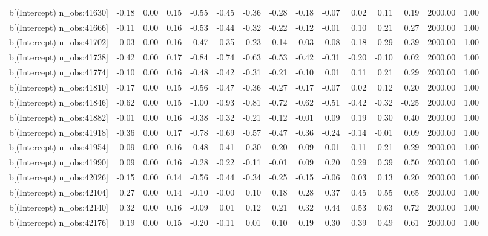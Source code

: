 \begin{table}[ht]
\begin{tabular}{rrrrrrrrrrrrrrr}
  b[(Intercept) n\_obs:41630] & -0.18 & 0.00 & 0.15 & -0.55 & -0.45 & -0.36 & -0.28 & -0.18 & -0.07 & 0.02 & 0.11 & 0.19 & 2000.00 & 1.00 \\ 
  b[(Intercept) n\_obs:41666] & -0.11 & 0.00 & 0.16 & -0.53 & -0.44 & -0.32 & -0.22 & -0.12 & -0.01 & 0.10 & 0.21 & 0.27 & 2000.00 & 1.00 \\ 
  b[(Intercept) n\_obs:41702] & -0.03 & 0.00 & 0.16 & -0.47 & -0.35 & -0.23 & -0.14 & -0.03 & 0.08 & 0.18 & 0.29 & 0.39 & 2000.00 & 1.00 \\ 
  b[(Intercept) n\_obs:41738] & -0.42 & 0.00 & 0.17 & -0.84 & -0.74 & -0.63 & -0.53 & -0.42 & -0.31 & -0.20 & -0.10 & 0.02 & 2000.00 & 1.00 \\ 
  b[(Intercept) n\_obs:41774] & -0.10 & 0.00 & 0.16 & -0.48 & -0.42 & -0.31 & -0.21 & -0.10 & 0.01 & 0.11 & 0.21 & 0.29 & 2000.00 & 1.00 \\ 
  b[(Intercept) n\_obs:41810] & -0.17 & 0.00 & 0.15 & -0.56 & -0.47 & -0.36 & -0.27 & -0.17 & -0.07 & 0.02 & 0.12 & 0.20 & 2000.00 & 1.00 \\ 
  b[(Intercept) n\_obs:41846] & -0.62 & 0.00 & 0.15 & -1.00 & -0.93 & -0.81 & -0.72 & -0.62 & -0.51 & -0.42 & -0.32 & -0.25 & 2000.00 & 1.00 \\ 
  b[(Intercept) n\_obs:41882] & -0.01 & 0.00 & 0.16 & -0.38 & -0.32 & -0.21 & -0.12 & -0.01 & 0.09 & 0.19 & 0.30 & 0.40 & 2000.00 & 1.00 \\ 
  b[(Intercept) n\_obs:41918] & -0.36 & 0.00 & 0.17 & -0.78 & -0.69 & -0.57 & -0.47 & -0.36 & -0.24 & -0.14 & -0.01 & 0.09 & 2000.00 & 1.00 \\ 
  b[(Intercept) n\_obs:41954] & -0.09 & 0.00 & 0.16 & -0.48 & -0.41 & -0.30 & -0.20 & -0.09 & 0.01 & 0.11 & 0.21 & 0.29 & 2000.00 & 1.00 \\ 
  b[(Intercept) n\_obs:41990] & 0.09 & 0.00 & 0.16 & -0.28 & -0.22 & -0.11 & -0.01 & 0.09 & 0.20 & 0.29 & 0.39 & 0.50 & 2000.00 & 1.00 \\ 
  b[(Intercept) n\_obs:42026] & -0.15 & 0.00 & 0.14 & -0.56 & -0.44 & -0.34 & -0.25 & -0.15 & -0.06 & 0.03 & 0.13 & 0.20 & 2000.00 & 1.00 \\ 
  b[(Intercept) n\_obs:42104] & 0.27 & 0.00 & 0.14 & -0.10 & -0.00 & 0.10 & 0.18 & 0.28 & 0.37 & 0.45 & 0.55 & 0.65 & 2000.00 & 1.00 \\ 
  b[(Intercept) n\_obs:42140] & 0.32 & 0.00 & 0.16 & -0.09 & 0.01 & 0.12 & 0.21 & 0.32 & 0.44 & 0.53 & 0.63 & 0.72 & 2000.00 & 1.00 \\ 
  b[(Intercept) n\_obs:42176] & 0.19 & 0.00 & 0.15 & -0.20 & -0.11 & 0.01 & 0.10 & 0.19 & 0.30 & 0.39 & 0.49 & 0.61 & 2000.00 & 1.00 \\ 

\end{tabular}
\end{table}

